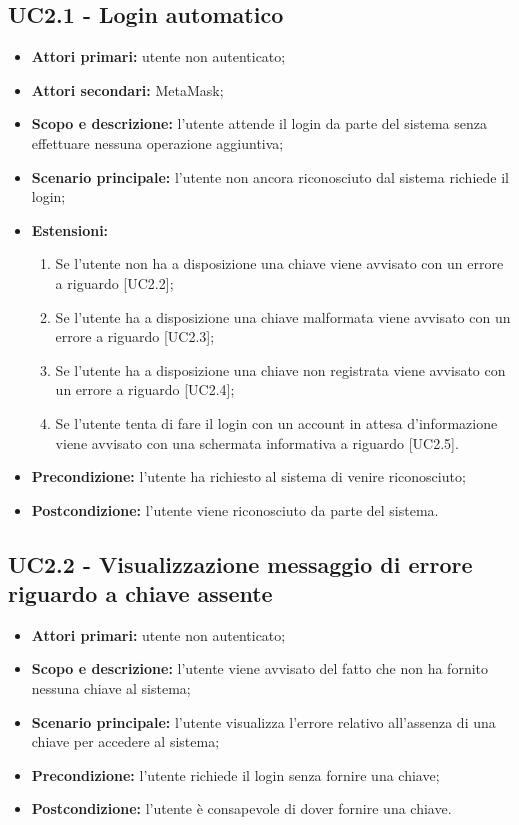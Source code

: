 \documentclass[AnalisiDeiRequisiti.tex]{subfiles}
\begin{document}
\subsection{UC2.1 - Login automatico}
\begin{itemize}
\item \textbf{Attori primari:} utente non autenticato;
\item \textbf{Attori secondari:} MetaMask;
\item \textbf{Scopo e descrizione:} l'utente attende il login da parte del sistema senza effettuare nessuna operazione aggiuntiva;
\item \textbf{Scenario principale:} l'utente non ancora riconosciuto dal sistema richiede il login;
\item \textbf{Estensioni:}
\begin{enumerate}
	\item Se l'utente non ha a disposizione una chiave viene avvisato con un errore a riguardo [UC2.2];
	\item Se l'utente ha a disposizione una chiave malformata viene avvisato con un errore a riguardo [UC2.3];
	\item Se l'utente ha a disposizione una chiave non registrata viene avvisato con un errore a riguardo [UC2.4];
	\item Se l'utente tenta di fare il login con un account in attesa d'informazione viene avvisato con una schermata informativa a riguardo [UC2.5].
\end{enumerate}
\item \textbf{Precondizione:} l'utente ha richiesto al sistema di venire riconosciuto;
\item \textbf{Postcondizione:} l'utente viene riconosciuto da parte del sistema.
\end{itemize}
\subsection{UC2.2 - Visualizzazione messaggio di errore riguardo a chiave assente}
\begin{itemize}
	\item \textbf{Attori primari:} utente non autenticato;
	\item \textbf{Scopo e descrizione:} l'utente viene avvisato del fatto che non ha fornito nessuna chiave al sistema;
	\item \textbf{Scenario principale:} l'utente visualizza l'errore relativo all'assenza di una chiave per accedere al sistema;
	\item \textbf{Precondizione:} l'utente richiede il login senza fornire una chiave;
	\item \textbf{Postcondizione:} l'utente è consapevole di dover fornire una chiave.
\end{itemize}
\end{document}
